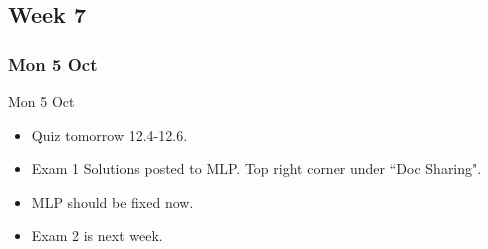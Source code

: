 \documentclass[12pt]{beamer}
\theoremstyle{plain}
\theoremstyle{definition}
\begin{document}
\subsection{Week 7}
\subsubsection{Mon 5 Oct}
\begin{frame}{Mon 5 Oct}%
\begin{itemize}
\item Quiz tomorrow 12.4-12.6.
\item Exam 1 Solutions posted to MLP.  Top right corner under ``Doc Sharing".
\item MLP should be fixed now.
\item Exam 2 is next week.
\end{itemize}
\end{frame}
\end{document}

